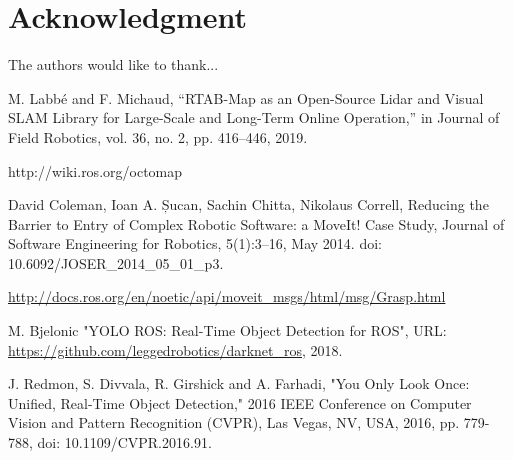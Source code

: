 \documentclass[conference,a4paper]{IEEEtran}
\begin{document}
\section*{Acknowledgment}


The authors would like to thank...




%
%
%
\begin{thebibliography}{1}

M. Labbé and F. Michaud, “RTAB-Map as an Open-Source Lidar and Visual SLAM Library for Large-Scale and Long-Term Online Operation,” in Journal of Field Robotics, vol. 36, no. 2, pp. 416–446, 2019. 

http://wiki.ros.org/octomap

David Coleman, Ioan A. Șucan, Sachin Chitta, Nikolaus Correll, Reducing the Barrier to Entry of Complex Robotic Software: a MoveIt! Case Study, Journal of Software Engineering for Robotics, 5(1):3–16, May 2014. doi: 10.6092/JOSER\_2014\_05\_01\_p3.

\url{http://docs.ros.org/en/noetic/api/moveit_msgs/html/msg/Grasp.html}

M. Bjelonic "YOLO ROS: Real-Time Object Detection for ROS", URL: \url{https://github.com/leggedrobotics/darknet_ros}, 2018.

J. Redmon, S. Divvala, R. Girshick and A. Farhadi, "You Only Look Once: Unified, Real-Time Object Detection," 2016 IEEE Conference on Computer Vision and Pattern Recognition (CVPR), Las Vegas, NV, USA, 2016, pp. 779-788, doi: 10.1109/CVPR.2016.91.

\end{thebibliography}




\end{document}
